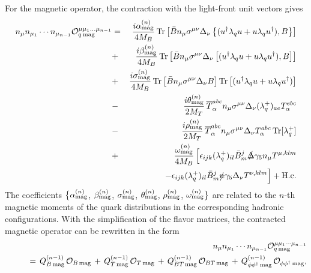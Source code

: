 \documentclass[preprintnumbers,prd,superscriptaddress,preprint]{revtex4-1}
\begin{document}
\clearpage
For the magnetic operator, the contraction with the light-front unit vectors gives
%
\begin{eqnarray}
\label{eq.opmag}
n_\mu n_{\mu_1}\cdots n_{\mu_{n-1}} {\cal O}_{q\,\rm mag}^{\mu\mu_1\ldots\mu_{n-1}}
&=& \frac{i\alpha_{\rm mag}^{(n)}}{4M_B}\,
{\rm Tr}
\left[ \bar{B} n_\mu \sigma^{\mu\nu}\Delta_\nu \left\{(u^\dag \lambda_q u + u
\lambda_q u^\dag),B\right\}
\right] 
\nonumber\\
&+& \frac{i\beta_{\rm mag}^{(n)}}{4M_B}\,
{\rm Tr}
\left[ \bar{B} n_\mu \sigma^{\mu\nu}\Delta_\nu \left[(u^\dag \lambda_q u + u
\lambda_q u^\dag),B \right]
\right]  
\nonumber\\
&+& \frac{i\sigma_{\rm mag}^{(n)}}{4M_B}\,
{\rm Tr}
\left[ \bar{B} n_\mu \sigma^{\mu\nu}\Delta_\nu B 
\right]
{\rm Tr}
\left[ (u^\dag \lambda_q u + u \lambda_q u^\dag)
\right]
\nonumber\\
&-& \frac{i\theta_{\rm mag}^{(n)}}{2M_T}\,
\overline{T}_\alpha^{abc} n_\mu \sigma^{\mu\nu} \Delta_\nu (\lambda_q^+)_{ae} T_\alpha^{ebc}
\nonumber\\
&-& \frac{i\rho_{\rm mag}^{(n)}}{2M_T}\,
\overline{T}_\alpha^{abc} n_\mu \sigma^{\mu\nu} \Delta_\nu T_\alpha^{abc}\,
{\rm Tr}[\lambda_q^+]
\notag\\
&+& \frac{\omega_{\rm mag}^{(n)}}{4M_B}\,
\Big[ 
  \epsilon_{ijk}(\lambda_q^+)_{il} \bar{B}^j_m \slashed{\Delta} \gamma_5 n_\mu T^{\mu,klm} 
\notag\\
& & \hspace*{0.9cm}
- \epsilon_{ijk}(\lambda_q^+)_{il} \bar{B}^j_m \slashed{n} \gamma_5 \Delta_\nu T^{\nu,klm}
\Big] 
+ {\rm H.c.}
\end{eqnarray}
%
The coefficients $\big\{ \alpha_{\rm mag}^{(n)}$, $\beta_{\rm mag}^{(n)}$, $\sigma_{\rm mag}^{(n)}$, $\theta_{\rm mag}^{(n)}$, $\rho_{\rm mag}^{(n)}$, $\omega_{\rm mag}^{(n)} \big\}$ are related to the $n$-th magnetic moments of the quark distributions in the corresponding hadronic configurations.
With the simplification of the flavor matrices, the contracted magnetic operator can be rewritten in the form
%
\begin{eqnarray}
&& \hspace*{-0.5cm}
n_\mu n_{\mu_1}\cdots n_{\mu_{n-1}}{\cal O}_{q\,\rm mag}^{\mu\mu_1\cdots\mu_{n-1}}
\notag\\
&& \hspace*{0.7cm}
=\, Q_{B\, \rm mag}^{(n-1)}\, {\cal O}_{B\, \rm mag}\,
+\, Q_{T\, \rm mag}^{(n-1)}\, {\cal O}_{T\, \rm mag}\,
+\, Q_{BT\, \rm mag}^{(n-1)}\, {\cal O}_{BT\, \rm mag}\,
+\, Q_{\phi\phi^\dag\, \rm mag}^{(n-1)}\, {\cal O}_{\phi\phi^\dag\, \rm mag},
\end{eqnarray}
\end{document}
